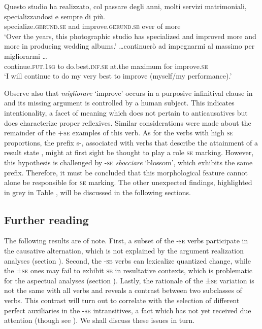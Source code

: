 \documentclass[output=paper,colorlinks,citecolor=brown
]{langscibook}
\begin{document}
\ea \label{bentley_example_7}
    \ea \label{bentley_example_7a}
    \gll Questo studio ha realizzato, col passare degli anni, molti servizi matrimoniali, specializzandosi e  sempre di	più. \\
    {} specialize.\textsc{gerund}.\textsc{se} and improve.\textsc{gerund}.\textsc{se} ever of more\\
    \glt ‘Over the years, this photographic studio has specialized and improved more and more in producing wedding albums.’
    \ex \label{bentley_example_7b}
    \gll  \ldots  continuerò ad impegnarmi al massimo per migliorarmi \ldots  \\
    continue.\textsc{fut}.1\textsc{sg}	to do.best.\textsc{inf}.\textsc{se} at.the maximum for improve.\textsc{se} \\
    \glt ‘I will continue to do my very best to improve (myself/my performance).’
    \z
\z

Observe also that \textit{migliorare} ‘improve’ occurs in a purposive infinitival clause in  and its missing argument is controlled by a human subject. This indicates intentionality, a facet of meaning which does not pertain to anticausatives but does characterize proper reflexives. Similar considerations were made about the remainder of the +\textsc{se} examples of this verb. 
As for the verbs with high \textsc{se} proportions, the prefix s-, associated with verbs that describe the attainment of a result state \citep[112, 146, 159]{iacobini2004prefissazione}, might at first sight be thought to play a role \textsc{se} marking. However, this hypothesis is challenged by -\textsc{se} \textit{sbocciare} ‘blossom’, which exhibits the same prefix. Therefore, it must be concluded that this morphological feature cannot alone be responsible for \textsc{se} marking. The other unexpected findings, highlighted in grey in Table , will be discussed in the following sections.  

\subsection{Further reading}
\label{bentley_section_3.3}
The following results are of note. First, a subset of the -\textsc{se} verbs participate in the causative alternation, which is not explained by the argument realization analyses (section ). Second, the -\textsc{se} verbs can lexicalize quantized change, while the ±\textsc{se} ones may fail to exhibit \textsc{se} in resultative contexts, which is problematic for the aspectual analyses (section ). Lastly, the rationale of the ±\textsc{se} variation is not the same with all verbs and reveals a contrast between two subclasses of verbs. 
This contrast will turn out to correlate with the selection of different perfect auxiliaries in the -\textsc{se} intransitives, a fact which has not yet received due attention (though see \cite{bentley2021two}). We shall discuss these issues in turn.
\end{document}
